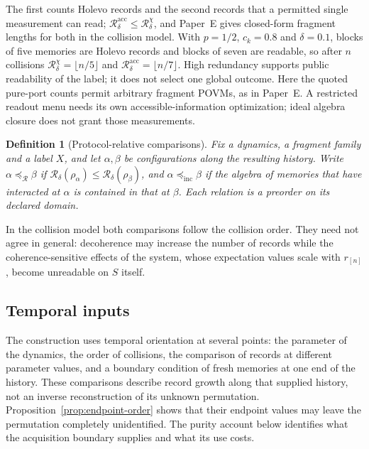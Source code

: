 \documentclass[12pt,a4paper]{article}
\newtheorem{definition}[theorem]{Definition}
\begin{document}
The first counts Holevo records and the second records that a permitted single measurement can read; $\mathcal R^{\mathrm{acc}}_\delta\le\mathcal R^{\chi}_\delta$, and Paper~E gives closed-form fragment lengths for both in the collision model. With $p=1/2$, $c_k=0.8$ and $\delta=0.1$, blocks of five memories are Holevo records and blocks of seven are readable, so after $n$ collisions $\mathcal R^\chi_\delta=\lfloor n/5\rfloor$ and $\mathcal R^{\mathrm{acc}}_\delta=\lfloor n/7\rfloor$. High redundancy supports public readability of the label; it does not select one global outcome.
Here the quoted pure-port counts permit arbitrary fragment POVMs, as
in Paper~E. A restricted readout menu needs its own accessible-information
optimization; ideal algebra closure does not grant those measurements.

\begin{definition}[Protocol-relative comparisons]
\label{def:ordering}
Fix a dynamics, a fragment family and a label $X$, and let $\alpha,\beta$ be configurations along the resulting history. Write $\alpha\preceq_{\mathcal R}\beta$ if $\mathcal R_\delta(\rho_\alpha)\le\mathcal R_\delta(\rho_\beta)$, and $\alpha\preceq_{\mathrm{inc}}\beta$ if the algebra of memories that have interacted at $\alpha$ is contained in that at $\beta$. Each relation is a preorder on its declared domain.
\end{definition}

In the collision model both comparisons follow the collision order. They need not agree in general: decoherence may increase the number of records while the coherence-sensitive effects of the system, whose expectation values scale with $r_{[n]}$, become unreadable on $S$ itself.

\subsection{Temporal inputs}

The construction uses temporal orientation at several points: the parameter of the dynamics, the order of collisions, the comparison of records at different parameter values, and a boundary condition of fresh memories at one end of the history. These comparisons describe record growth along that supplied history, not an inverse reconstruction of its unknown permutation. Proposition~\ref{prop:endpoint-order} shows that their endpoint values may leave the permutation completely unidentified. The purity account below identifies what the acquisition boundary supplies and what its use costs.
\end{document}
